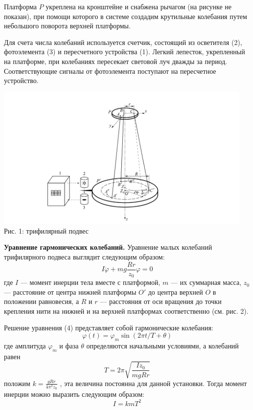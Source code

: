 \documentclass[12pt]{article}
\begin{document}
    Платформа $P$ укреплена на кронштейне и снабжена рычагом (на рисунке не показан), при помощи которого в системе создадим крутильные колебания путем небольшого поворота верхней платформы.

    Для счета числа колебаний используется счетчик, состоящий из осветителя (2), фотоэлемента (3) и пересчетного устройства (1). Легкий лепесток, укрепленный на платформе, при колебаниях пересекает световой луч дважды за период. Соответствующие сигналы от фотоэлемента поступают на пересчетное устройство.

    \begin{center} 
        \includegraphics[width=5in]{trif2.png} \\ Рис. 1: трифилярный подвес
    \end{center}
    
    \textbf{Уравнение гармонических колебаний.} Уравнение малых колебаний трифилярного подвеса выглядит следующим образом:
    \begin{equation}
        I\ddot{\varphi} + mg \frac{Rr}{z_0}\varphi = 0
    \end{equation} 
    где $I$ — момент инерции тела вместе с платформой, $m$ — их суммарная масса, $z_0$ — расстояние от центра нижней платформы $O'$ до центра верхней $O$ в положении равновесия, а $R$ и $r$ — расстояния от оси вращения до точки крепления нити на нижней и на верхней платформах соответственно (см. рис. 2).

    Решение уравнения (4) представляет собой гармонические колебания:
    \begin{equation}
        \varphi(t) = \varphi_m \sin(2\pi t/T + \theta)
    \end{equation} 
    где амплитуда $\varphi_m$ и фаза $\theta$ определяются начальными условиями, а
    { колебаний} равен
    \begin{equation}
        T = 2 \pi \sqrt{\frac{I z_0}{mgRr}}
    \end{equation} 
    положим $k = \frac{gRr}{4\pi^2z_0}$ , эта величина постоянна для данной установки. Тогда момент инерции можно выразить следующим образом:
    \begin{equation}
        I = kmT^2
    \end{equation}
\end{document}
